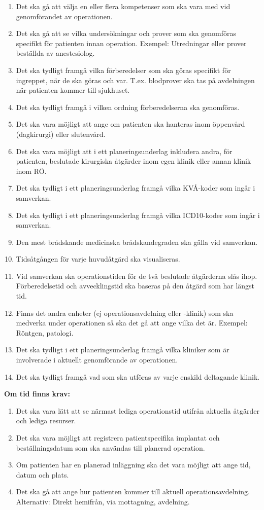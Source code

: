 \documentclass[twoside]{article}
\begin{document}
\begin{enumerate}[resume]
\item Det ska gå att välja en eller flera kompetenser som ska vara med vid
genomförandet av operationen.
\item Det ska gå att se vilka undersökningar och prover som ska genomföras
specifikt för patienten innan operation. Exempel: Utredningar eller prover
beställda av anestesiolog.
\item Det ska tydligt framgå vilka förberedelser som ska göras specifikt för
ingreppet, när de ska göras och var. T.ex. blodprover ska tas på avdelningen
när patienten kommer till sjukhuset.
\item Det ska tydligt framgå i vilken ordning förberedelserna ska genomföras.
\item Det ska vara möjligt att ange om patienten ska hanteras inom öppenvård
(dagkirurgi) eller slutenvård.
\item Det ska vara möjligt att i ett planeringsunderlag inkludera andra, för
patienten, beslutade kirurgiska åtgärder inom egen klinik eller annan klinik
inom RÖ.
\item Det ska tydligt i ett planeringsunderlag framgå vilka KVÅ-koder som ingår
i samverkan.
\item Det ska tydligt i ett planeringsunderlag framgå vilka ICD10-koder som
ingår i samverkan.
\item Den mest brådskande medicinska brådskandegraden ska gälla vid samverkan.
\item Tidsåtgången för varje huvudåtgärd ska visualiseras.
\item Vid samverkan ska operationstiden för de två beslutade åtgärderna slås
ihop. Förberedelsetid och avvecklingstid ska baseras på den åtgärd som har
längst tid.
\item Finns det andra enheter (ej operationsavdelning eller -klinik) som ska
medverka under operationen så ska det gå att ange vilka det är.
Exempel: Röntgen, patologi.
\item Det ska tydligt i ett planeringsunderlag framgå vilka kliniker som är
involverade i aktuellt genomförande av operationen.
\item Det ska tydligt framgå vad som ska utföras av varje enskild deltagande
klinik.
\end{enumerate}
\textbf{Om tid finns krav:}
\begin{enumerate}[resume]
  \item Det ska vara lätt att se närmast lediga operationstid utifrån aktuella
  åtgärder och lediga resurser.
  \item Det ska vara möjligt att registrera patientspecifika implantat och
  beställningsdatum som ska användas till planerad operation.
  \item Om patienten har en planerad inläggning ska det vara möjligt att ange
  tid, datum och plats.
  \item Det ska gå att ange hur patienten kommer till aktuell
  operationsavdelning. Alternativ: Direkt hemifrån, via mottagning, avdelning.
\end{enumerate}
\end{document}
